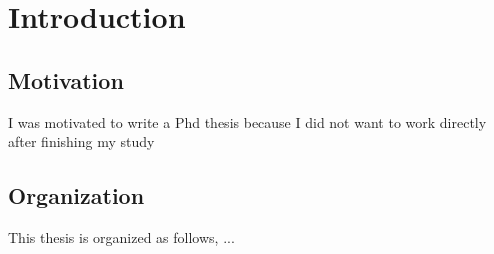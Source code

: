 \chapter{Introduction}
\section{Motivation}
I was motivated to write a Phd thesis because I did not want to work directly after finishing my study
\section{Organization}
This thesis is organized as follows, ...